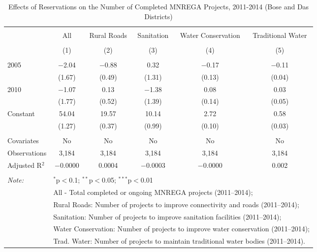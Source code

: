 
\begin{table}[!htbp] \centering 
  \caption{Effects of Reservations on the Number of Completed MNREGA Projects, 2011-2014 (Bose and Das Districts)} 
  \label{} 
\scriptsize 
\begin{tabular}{@{\extracolsep{5pt}}lccccc} 
\\[-1.8ex]\hline 
\hline \\[-1.8ex] 
 & All & Rural Roads & Sanitation & Water Conservation & Traditional Water \\ 
\\[-1.8ex] & (1) & (2) & (3) & (4) & (5)\\ 
\hline \\[-1.8ex] 
 2005 & $-$2.04 & $-$0.88 & 0.32 & $-$0.17 & $-$0.11 \\ 
  & (1.67) & (0.49) & (1.31) & (0.13) & (0.04) \\ 
  2010 & $-$1.07 & 0.13 & $-$1.38 & 0.08 & 0.03 \\ 
  & (1.77) & (0.52) & (1.39) & (0.14) & (0.05) \\ 
  Constant & 54.04 & 19.57 & 10.14 & 2.72 & 0.58 \\ 
  & (1.27) & (0.37) & (0.99) & (0.10) & (0.03) \\ 
 \hline \\[-1.8ex] 
Covariates & No & No & No & No & No \\ 
Observations & 3,184 & 3,184 & 3,184 & 3,184 & 3,184 \\ 
Adjusted R$^{2}$ & $-$0.0000 & 0.0004 & $-$0.0003 & $-$0.0000 & 0.002 \\ 
\hline 
\hline \\[-1.8ex] 
\textit{Note:}  & \multicolumn{5}{l}{$^{*}$p$<$0.1; $^{**}$p$<$0.05; $^{***}$p$<$0.01} \\ 
 & \multicolumn{5}{l}{All - Total completed or ongoing MNREGA projects (2011--2014);} \\ 
 & \multicolumn{5}{l}{Rural Roads: Number of projects to improve connectivity and roads (2011--2014);} \\ 
 & \multicolumn{5}{l}{Sanitation:  Number of projects to improve sanitation facilities  (2011--2014);} \\ 
 & \multicolumn{5}{l}{Water Conservation: Number of projects to improve water conservation (2011--2014);} \\ 
 & \multicolumn{5}{l}{Trad. Water: Number of projects to maintain traditional water bodies (2011--2014).} \\ 
\end{tabular} 
\end{table} 
